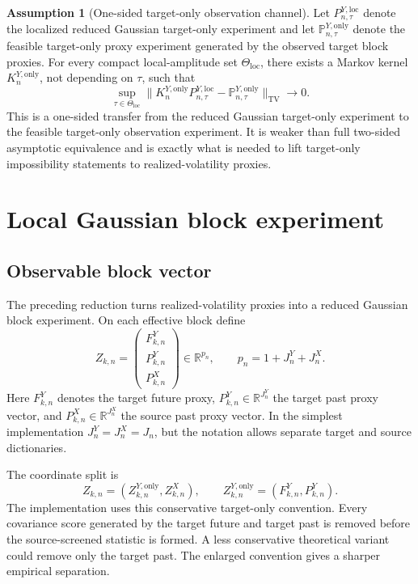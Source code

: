 \documentclass[11pt,a4paper]{amsart}
\theoremstyle{plain}
\theoremstyle{definition}
\newtheorem{assumption}[theorem]{Assumption}
\theoremstyle{remark}
\newcommand{\R}{\mathbb{R}}
\newcommand{\PP}{\mathbb{P}}
\begin{document}
\begin{assumption}[One-sided target-only observation channel]\label{ass:target-only-channel}
Let \(P_{n,\tau}^{Y,\mathrm{loc}}\) denote the localized reduced Gaussian target-only experiment and
let \(\PP_{n,\tau}^{Y,\mathrm{only}}\) denote the feasible target-only proxy experiment generated by
the observed target block proxies.  For every compact local-amplitude set
\(\Theta_{\mathrm{loc}}\), there exists a Markov kernel \(K_n^{Y,\mathrm{only}}\), not depending on
\(\tau\), such that
\[
        \sup_{\tau\in\Theta_{\mathrm{loc}}}
        \bigl\|
        K_n^{Y,\mathrm{only}}P_{n,\tau}^{Y,\mathrm{loc}}
        -
        \PP_{n,\tau}^{Y,\mathrm{only}}
        \bigr\|_{\mathrm{TV}}
        \to0.
\]
This is a one-sided transfer from the reduced Gaussian target-only experiment to the feasible
target-only observation experiment.  It is weaker than full two-sided asymptotic equivalence and is
exactly what is needed to lift target-only impossibility statements to realized-volatility proxies.
\end{assumption}

\section{Local Gaussian block experiment}\label{sec:gaussian-block}

\subsection{Observable block vector}

The preceding reduction turns realized-volatility proxies into a reduced Gaussian block experiment.
On each effective block define
\[
        Z_{k,n}
        =
        \begin{pmatrix}
        F_{k,n}^{Y}\\
        P_{k,n}^{Y}\\
        P_{k,n}^{X}
        \end{pmatrix}
        \in \R^{p_n},
        \qquad
        p_n=1+J_n^Y+J_n^X.
\]
Here \(F_{k,n}^{Y}\) denotes the target future proxy, \(P_{k,n}^{Y}\in\R^{J_n^Y}\) the target past
proxy vector, and \(P_{k,n}^{X}\in\R^{J_n^X}\) the source past proxy vector.  In the simplest
implementation \(J_n^Y=J_n^X=J_n\), but the notation allows separate target and source dictionaries.

The coordinate split is
\[
        Z_{k,n}
        =
        (Z_{k,n}^{Y,\mathrm{only}},Z_{k,n}^{X}) ,
        \qquad
        Z_{k,n}^{Y,\mathrm{only}}
        =
        (F_{k,n}^{Y},P_{k,n}^{Y}).
\]
The implementation uses this conservative target-only convention.  Every covariance score generated
by the target future and target past is removed before the source-screened statistic is formed.  A
less conservative theoretical variant could remove only the target past.  The enlarged convention
gives a sharper empirical separation.
\end{document}

